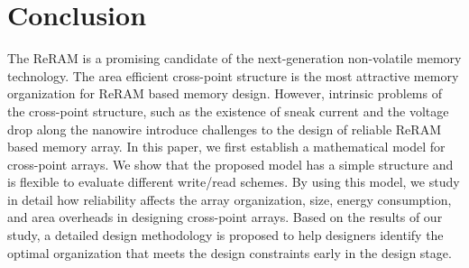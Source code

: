 \section{Conclusion}\label{sec:conclusion}

The ReRAM is a promising candidate of the next-generation non-volatile memory technology. The area efficient cross-point structure is the most attractive memory organization for ReRAM based memory design. However, intrinsic problems of the cross-point structure, such as the existence of sneak current and the voltage drop along the nanowire introduce challenges to the design of reliable ReRAM based memory array. In this paper, we first establish a mathematical model for cross-point arrays. We show that the proposed model has a simple structure and is flexible to evaluate different write/read schemes. By using this model, we study in detail how reliability affects the array organization, size, energy consumption, and area overheads in designing cross-point arrays. Based on the results of our study, a detailed design methodology is proposed to help designers identify the optimal organization that meets the design constraints early in the design stage.
